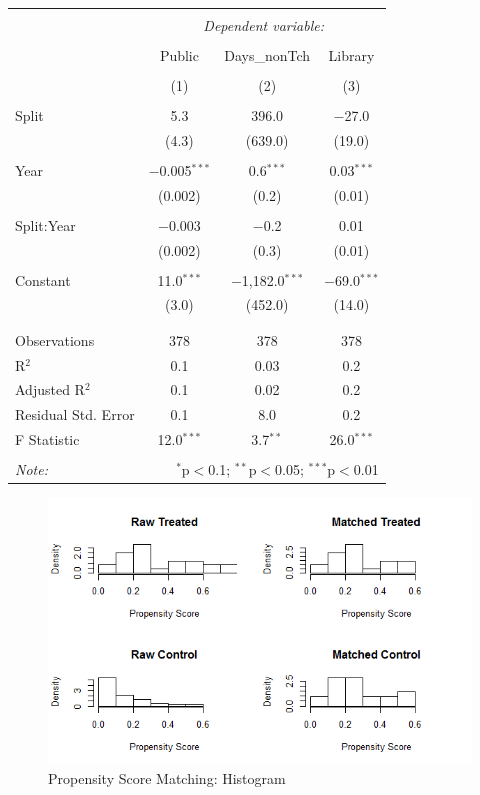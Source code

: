 \documentclass[12pt, a4paper]{article}
\begin{document}
\begin{table}[!htbp] \centering 
  \caption{} 
  \label{} 
\begin{tabular}{@{\extracolsep{5pt}}lccc} 
\\[-1.8ex]\hline 
\hline \\[-1.8ex] 
 & \multicolumn{3}{c}{\textit{Dependent variable:}} \\ 
\cline{2-4} 
\\[-1.8ex] & Public & Days\_nonTch & Library \\ 
\\[-1.8ex] & (1) & (2) & (3)\\ 
\hline \\[-1.8ex] 
 Split & 5.3 & 396.0 & $-$27.0 \\ 
  & (4.3) & (639.0) & (19.0) \\ 
  & & & \\ 
 Year & $-$0.005$^{***}$ & 0.6$^{***}$ & 0.03$^{***}$ \\ 
  & (0.002) & (0.2) & (0.01) \\ 
  & & & \\ 
 Split:Year & $-$0.003 & $-$0.2 & 0.01 \\ 
  & (0.002) & (0.3) & (0.01) \\ 
  & & & \\ 
 Constant & 11.0$^{***}$ & $-$1,182.0$^{***}$ & $-$69.0$^{***}$ \\ 
  & (3.0) & (452.0) & (14.0) \\ 
  & & & \\ 
\hline \\[-1.8ex] 
Observations & 378 & 378 & 378 \\ 
R$^{2}$ & 0.1 & 0.03 & 0.2 \\ 
Adjusted R$^{2}$ & 0.1 & 0.02 & 0.2 \\ 
Residual Std. Error & 0.1 & 8.0 & 0.2 \\ 
F Statistic & 12.0$^{***}$ & 3.7$^{**}$ & 26.0$^{***}$ \\ 
\hline 
\hline \\[-1.8ex] 
\textit{Note:}  & \multicolumn{3}{r}{$^{*}$p$<$0.1; $^{**}$p$<$0.05; $^{***}$p$<$0.01} \\ 
\end{tabular} 
\end{table} 
\begin{figure}[h]
    \centering
    \includegraphics{PSMatch}
    \caption{Propensity Score Matching: Histogram}
    \label{Fig1}
\end{figure}
 
\end{document}
